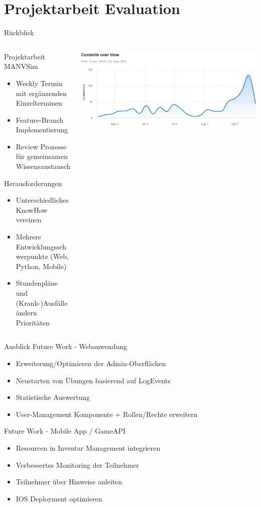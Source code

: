 \section{Projektarbeit Evaluation}

\begin{frame}{Rückblick}
	\begin{columns}
		\begin{column}{0.5\textwidth}
			Projektarbeit MANVSim 
			\begin{itemize}
				\item Weekly Termin mit ergänzenden Einzelterminen
				\item Feature-Branch Implementierung
				\item Review Prozesse für gemeinsamen Wissensaustausch
			\end{itemize}
			Herausforderungen
			\begin{itemize}
				\item Unterschiedliches KnowHow vereinen
				\item Mehrere Entwicklungsschwerpunkte (Web, Python, Mobile)
				\item Stundenpläne und (Krank-)Ausfälle ändern Prioritäten
			\end{itemize}
		\end{column}
		\begin{column}{0.5\textwidth}
			\centering
			\includegraphics[height=0.4\textheight]{images/Commits_over_time.png}
		\end{column}
	\end{columns}
\end{frame}
\begin{frame}{Ausblick}
	Future Work - Webanwendung
	\begin{itemize}
		\item Erweiterung/Optimieren der Admin-Oberflächen
		\item Neustarten von Übungen basierend auf LogEvents
		\item Statistische Auswertung
		\item User-Management Komponente + Rollen/Rechte erweitern 	
	\end{itemize}

    Future Work - Mobile App / GameAPI
	\begin{itemize}
		\item Resourcen in Inventar Management integrieren
		\item Verbessertes Monitoring der Teilnehmer
		\item Teilnehmer über Hinweise anleiten
		\item IOS Deployment optimieren
	\end{itemize}
\end{frame}